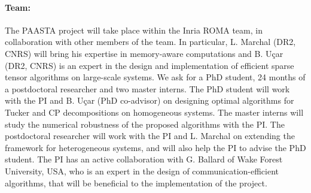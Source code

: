 \documentclass[a4paper,11pt, margin=2cm]{article}
\begin{document}
	\vspace*{-0.25cm}\paragraph{Team:} The PAASTA project will take place within the Inria ROMA team, in collaboration with other members of the team. In particular, L. Marchal (DR2, CNRS) will bring his expertise in memory-aware computations and B. Uçar (DR2, CNRS) is an expert in the design and implementation of efficient sparse tensor algorithms on large-scale systems.
	We ask for a PhD student, 24 months of a postdoctoral researcher and two master interns. The PhD student will work with the PI and B. Uçar (PhD co-advisor) on designing optimal algorithms for Tucker and CP decompositions on homogeneous systems. The master interns will study the numerical robustness of the proposed algorithms with the PI. The postdoctoral researcher will work with the PI and L. Marchal on extending the framework for heterogeneous systems, and will also help the PI to advise the PhD student. The PI has an active collaboration with G. Ballard of Wake Forest University, USA, who is an expert in the design of communication-efficient algorithms, that will be beneficial to the implementation of the project. 
	
	
	
	
	
\end{document}
